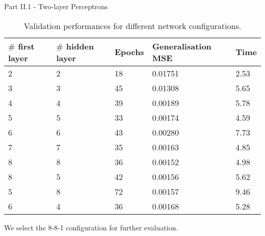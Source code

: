 \documentclass{beamer}
\begin{document}
\begin{frame}{Part II.1 - Two-layer Perceptrons}
    
    \begin{table}[H]
    \footnotesize
    \begin{center}
    \bgroup
    \def\arraystretch{1}
    \begin{tabular}{|l|l|l|l|l|} \hline
    $\#$ first layer & $\#$ hidden layer & Epochs & Generalisation MSE & Time\\ \hline
    2 & 2 & 18 & 0.01751 & 2.53 \\ \hline
    3 & 3 & 45 & 0.01308 & 5.65 \\ \hline
    4 & 4 & 39 & 0.00189 & 5.78 \\ \hline
    5 & 5 & 33 & 0.00174 & 4.59 \\ \hline
    6 & 6 & 43 & 0.00280 & 7.73 \\ \hline
    7 & 7 & 35 & 0.00163 & 4.85 \\ \hline
    8 & 8 & 36 & 0.00152 & 4.98 \\ \hline
    8 & 5 & 42 & 0.00156 & 5.62 \\ \hline
    5 & 8 & 72 & 0.00157 & 9.46 \\ \hline
    6 & 4 & 36 & 0.00168 & 5.28 \\ \hline
    \end{tabular}
    \end{center}
    \caption{Validation performances for different network configurations.}
\end{table}

We select the 8-8-1 configuration for further evaluation.  
    
\end{frame}
\end{document}

